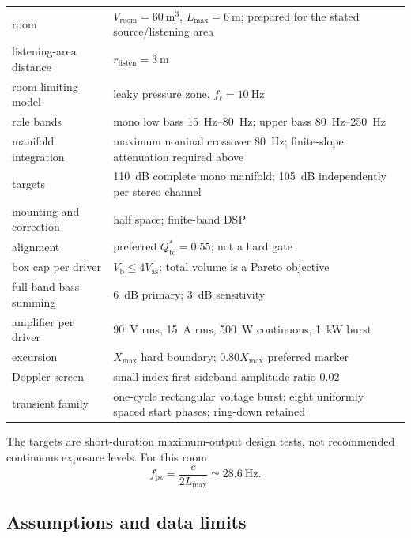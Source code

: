 \documentclass[11pt,a4paper]{article}
\numberwithin{equation}{section}
\newcommand{\Xmax}{X_{\mathrm{max}}}
\newcommand{\Qtc}{Q_{\mathrm{tc}}}
\newcommand{\Vas}{V_{\mathrm{as}}}
\newcommand{\Vb}{V_{\mathrm{b}}}
\begin{document}
\begin{center}
\small
\begin{tabular}{@{}p{4.0cm}p{9.4cm}@{}}
\toprule
room & $V_{\mathrm{room}}=\SI{60}{\cubic\meter}$,
$L_{\max}=\SI{6}{\meter}$; prepared for the stated source/listening area\\
listening-area distance & $r_{\mathrm{listen}}=\SI{3}{\meter}$\\
room limiting model & leaky pressure zone, $f_\ell=\SI{10}{\hertz}$\\
role bands & mono low bass \SIrange{15}{80}{\hertz};
upper bass \SIrange{80}{250}{\hertz}\\
manifold integration & maximum nominal crossover \SI{80}{\hertz};
finite-slope attenuation required above\\
targets & \SI{110}{dB} complete mono manifold;
\SI{105}{dB} independently per stereo channel\\
mounting and correction & half space; finite-band DSP\\
alignment & preferred $\Qtc^\ast=0.55$; not a hard gate\\
box cap per driver & $\Vb\le4\Vas$; total volume is a Pareto objective\\
full-band bass summing & \SI{6}{dB} primary; \SI{3}{dB} sensitivity\\
amplifier per driver & \SI{90}{\volt} rms, \SI{15}{\ampere} rms,
\SI{500}{\watt} continuous, \SI{1}{\kilo\watt} burst\\
excursion & $\Xmax$ hard boundary; $0.80\Xmax$ preferred marker\\
Doppler screen & small-index first-sideband amplitude ratio $0.02$\\
transient family & one-cycle rectangular voltage burst; eight uniformly
spaced start phases; ring-down retained\\
\bottomrule
\end{tabular}
\end{center}

The targets are short-duration maximum-output design tests, not recommended
continuous exposure levels.  For this room
\begin{equation}
	f_{\mathrm{pz}}=\frac{c}{2L_{\max}}\simeq\SI{28.6}{\hertz}.
	\label{eq:fpz}
\end{equation}

\subsection{Assumptions and data limits}
\label{sec:assumptions}
\end{document}
